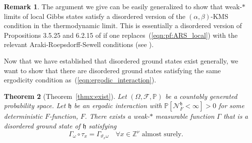 \documentclass{article}
\newcommand{\calN}{\mathcal{N}^{\mathfrak{h}}_F}
\newcommand{\Znu}{\mathbb{Z}^\nu}
\renewcommand{\P}{\mathbb{P}}
\newcommand{\<}{\langle}
\renewcommand{\>}{\rangle}
\newcommand{\h}{\mathfrak{h}}
\newtheorem{thm}{Theorem}[section]
\theoremstyle{definition}
\newtheorem{rmk}[thm]{Remark}
\numberwithin{equation}{section}
\begin{document}
\begin{rmk}\label{rmk:Gibbs_1}
	The argument we give can be easily generalized to show that weak-$\ast$ limits of local Gibbs states satisfy a disordered version of the $(\alpha, \beta)$-KMS condition in the thermodynamic limit. This is essentially a disordered version of Propositions 3.5.25 and 6.2.15 of \cite{BratteliRobinsonII} if one replaces~(\ref{eqn:pf:ARS_local}) with the relevant Araki-Roepsdorff-Sewell conditions (see \cite[Theorem 3.5.15]{BratteliRobinsonII}). 
\end{rmk}

Now that we have established that disordered ground states exist generally, we want to show that there are disordered ground states satisfying the same ergodicity condition as~(\ref{eqn:ergodic_interaction}).
\begin{thm}[Theorem~\ref{thmx:exist}]\label{thm:exist}
	Let $(\Omega, \mathcal{F}, \P)$ be a countably generated probability space. Let $\h$ be an ergodic interaction with $\P[\calN <\infty]>0$ for some deterministic $F$-function, $F$.  There exists a weak-$\ast$ measurable function $\Gamma$ that is a disordered ground state of $\h$ satisfying 
	\begin{equation}
		\Gamma_\omega \circ \tau_x = \Gamma_{\vartheta_x \omega}\quad \forall x\in \Znu \text{ almost surely.}
	\end{equation} 
\end{thm}
\end{document}

